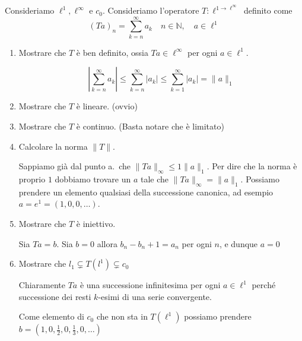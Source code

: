 \begin{eser}[Es. 3 del 15\--01\--2024]
    Consideriamo \(\ell^{1}, \ell^{\infty}\) e \(c_{0}\). Consideriamo
    l'operatore \(T : \ell^{1 \to \ell^{\infty}}\) definito come
    \[
      {(Ta)}_n = \sum_{k=n}^{\infty} a_{k} \quad n \in \mathbb{N}, \quad a \in
      \ell^{1}
    \]
\begin{enumerate}[label = \alph*.]
    \item Mostrare che \(T\) è ben definito, ossia \(Ta \in \ell^{\infty}\) per
        ogni \(a \in \ell^{1}\).
        
    \[
      \left| \sum_{k=n}^{\infty} a_{k} \right| \le \sum_{k=n}^{\infty} |a_{k}|
      \le \sum_{k=1}^{\infty} |a_{k}| = \|a\|_1  
    \]
    \item Mostrare che \(T\) è lineare. (ovvio)
    \item Mostrare che \(T\) è continuo. (Basta notare che è limitato)
    \item Calcolare la norma \(\|T\|\).

        Sappiamo già dal punto a.~che \(\|Ta\|_\infty \le 1\|a\|_1\). Per dire
        che la norma è proprio \(1\) dobbiamo trovare un \(a\) tale che
        \(\|Ta\|_\infty = \|a\|_1\). Possiamo prendere un elemento qualsiasi
        della successione canonica, ad esempio \(a = e^{1} = {(1, 0, 0,
        \dots)}\).
    \item Mostrare che \(T\) è iniettivo.

        Sia \(Ta = b\).
        Sia \(b = 0\) allora \(b_{n} - b_{n}+1 = a_{n}\) per ogni \(n\), e
        dunque \(a = 0\) 
    \item Mostrare che \(l_{1} \subsetneq  T{(l^{1})} \subsetneq c_{0}\) 

    Chiaramente \(Ta\) è una successione infinitesima per ogni \(a \in
    \ell^{1}\) perché successione dei resti \(k\)-esimi di una serie
    convergente. 

    Come elemento di \(c_{0}\) che non sta in \(T{(\ell^{1})}\) possiamo
    prendere \(b = {(1, 0, \frac{1}{2}, 0, \frac{1}{3}, 0, \dots)}\) 
\end{enumerate}
\end{eser}

